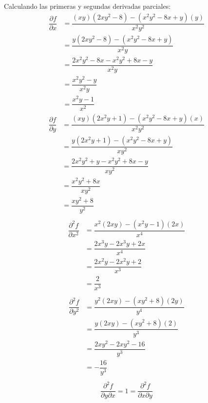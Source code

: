 \documentclass[fleqn, 12pt]{article}
\newcommand{\derivadaparcial}[2]{\dfrac{\partial {#1}}{\partial {#2}}}
\newcommand{\derivadaparcialn}[3]{\dfrac{\partial^{#3} {#1}}{\partial {#2}^{#3}}}
\newcommand{\derivadaparcialnd}[3]{\dfrac{\partial^{2} {#1}}{\partial {#3} \partial {#2}}}
\begin{document}
\begin{enumerate}
\begin{enumerate}
            Calculando las primeras y segundas derivadas parciales:
            \begin{align*}
                \derivadaparcial{f}{x} &= \dfrac{(xy)(2x y^2 - 8) - (x^2 y^2 - 8x + y)(y)}{x^2 y^2} \\
                &= \dfrac{y(2x y^2 - 8) - (x^2 y^2 - 8x + y)}{x^2 y} \\
                &= \dfrac{2x^2 y^2 - 8x - x^2 y^2 + 8x - y}{x^2 y} \\
                &= \dfrac{x^2 y^2 - y}{x^2 y} \\
                &= \dfrac{x^2 y - 1}{x^2}
            \end{align*}
            \begin{align*}
                \derivadaparcial{f}{y} &= \dfrac{(xy)(2x^2 y + 1) - (x^2 y^2 - 8x + y)(x)}{x^2 y^2} \\
                &= \dfrac{y(2x^2 y + 1) - (x^2 y^2 - 8x + y)}{x y^2} \\
                &= \dfrac{2x^2 y^2 + y - x^2 y^2 + 8x - y}{x y^2} \\
                &= \dfrac{x^2 y^2 + 8x}{x y^2} \\
                &= \dfrac{x y^2 + 8}{y^2} \\
            \end{align*}
            \begin{align*}
                \derivadaparcialn{f}{x}{2} &= \dfrac{x^2(2xy) - (x^2 y - 1)(2x)}{x^4} \\
                &= \dfrac{2x^3 y - 2x^3 y + 2x}{x^4} \\
                &= \dfrac{2x^2 y - 2x^2 y + 2}{x^3} \\
                &= \dfrac{2}{x^3} \\
            \end{align*}
            \begin{align*}
                \derivadaparcialn{f}{y}{2} &= \dfrac{y^2(2xy) - (x y^2 + 8)(2y)}{y^4} \\
                &= \dfrac{y(2xy) - (x y^2 + 8)(2)}{y^3} \\
                &= \dfrac{2x y^2 - 2x y^2 - 16}{y^3} \\
                &= - \dfrac{16}{y^3} \\
            \end{align*}
            \begin{align}
                \derivadaparcialnd{f}{x}{y} = 1 = \derivadaparcialnd{f}{y}{x}
            \end{align}
           

\end{enumerate}
\end{enumerate}
\end{document}
